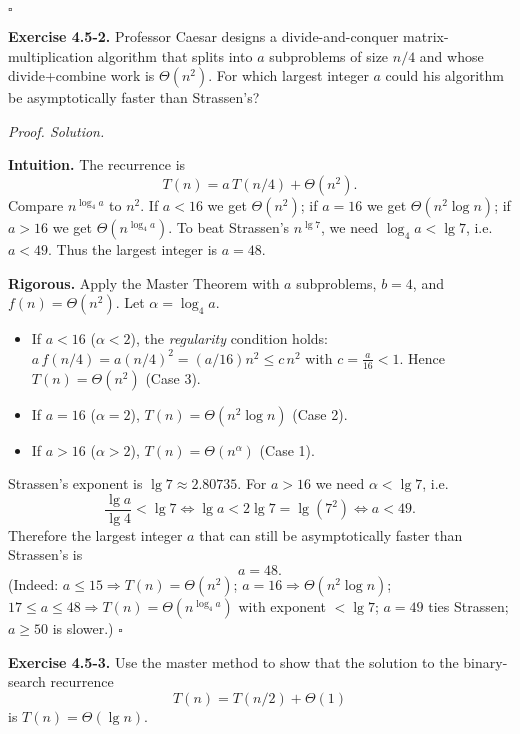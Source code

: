 \documentclass[12pt]{article}
\theoremstyle{definition}
\begin{document}
\hfill$\square$

\newpage

\noindent\textbf{Exercise 4.5-2.}
Professor Caesar designs a divide-and-conquer matrix-multiplication algorithm that
splits into $a$ subproblems of size $n/4$ and whose divide+combine work is $\Theta(n^2)$.
For which largest integer $a$ could his algorithm be asymptotically faster than Strassen’s?

\medskip
\noindent\textit{Proof. Solution.}

\noindent\textbf{Intuition.}
The recurrence is
\[
T(n)=a\,T(n/4)+\Theta(n^2).
\]
Compare $n^{\log_4 a}$ to $n^2$. If $a<16$ we get $\Theta(n^2)$; if $a=16$ we get $\Theta(n^2\log n)$;
if $a>16$ we get $\Theta(n^{\log_4 a})$. To beat Strassen’s $n^{\lg 7}$, we need
$\log_4 a<\lg 7$, i.e.\ $a<49$. Thus the largest integer is $a=\boxed{48}$.

\noindent\textbf{Rigorous.}
Apply the Master Theorem with $a$ subproblems, $b=4$, and $f(n)=\Theta(n^2)$.
Let $\alpha=\log_4 a$.

\begin{itemize}
  \item If $a<16$ ($\alpha<2$), the \emph{regularity} condition holds:
        $a\,f(n/4)=a(n/4)^2=(a/16)n^2\le c\,n^2$ with $c=\tfrac{a}{16}<1$.
        Hence $T(n)=\Theta(n^2)$ (Case 3).
  \item If $a=16$ ($\alpha=2$), $T(n)=\Theta(n^2\log n)$ (Case 2).
  \item If $a>16$ ($\alpha>2$), $T(n)=\Theta(n^{\alpha})$ (Case 1).
\end{itemize}

Strassen’s exponent is $\lg 7\approx 2.80735$.
For $a>16$ we need $\alpha<\lg 7$, i.e.
\[
\frac{\lg a}{\lg 4}<\lg 7
\iff \lg a < 2\lg 7 = \lg(7^2)
\iff a<49.
\]
Therefore the largest integer $a$ that can still be asymptotically faster than Strassen’s is
\[
\boxed{a=48}.
\]
(Indeed: $a\le 15\Rightarrow T(n)=\Theta(n^2)$; $a=16\Rightarrow \Theta(n^2\log n)$; 
$17\le a\le 48\Rightarrow T(n)=\Theta(n^{\log_4 a})$ with exponent $<\lg 7$;
$a=49$ ties Strassen; $a\ge 50$ is slower.)
\hfill$\square$

\newpage

\noindent\textbf{Exercise 4.5-3.}
Use the master method to show that the solution to the binary-search recurrence
\[
T(n)=T(n/2)+\Theta(1)
\]
is \(T(n)=\Theta(\lg n)\).
\end{document}
